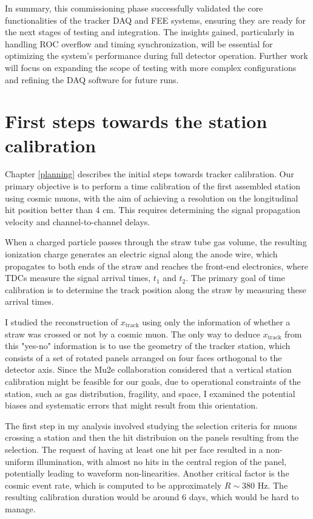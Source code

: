 In summary, this commissioning phase successfully validated 
the core functionalities 
of the tracker DAQ and FEE systems, ensuring they are ready 
for the next stages of 
testing and integration. The insights gained, particularly 
in handling ROC overflow 
and timing synchronization, will be essential for optimizing 
the system's performance 
during full detector operation. Further work will focus on 
expanding the scope of 
testing with more complex configurations and refining the 
DAQ software for future runs.


\section{First steps towards the station calibration}
Chapter \ref{planning} describes the initial steps towards 
tracker calibration. Our primary objective is to perform a time calibration of 
the first assembled station using cosmic muons, with the aim of achieving 
a resolution on the longitudinal hit position better than 4 cm. This  
requires determining the signal propagation velocity and 
channel-to-channel delays. 

When a charged particle passes through the straw tube gas volume, the 
resulting ionization charge generates an electric signal along the anode wire, 
which propagates to both ends of the straw and reaches the front-end 
electronics, where TDCs measure the signal arrival times, $t_1$ and $t_2$. The primary 
goal of time calibration is to determine the track position along the straw 
by measuring these arrival times. 

I studied the reconstruction of $x_{\text{track}}$ using only the 
information of whether a straw was crossed or not by a cosmic muon. The only 
way to deduce $x_{\text{track}}$ from this "yes-no" information is to use the geometry of the tracker station, 
which consists of a set of rotated panels arranged on four faces orthogonal 
to the detector axis. Since the Mu2e collaboration considered 
that a vertical station calibration might be feasible for our 
goals, due to operational constraints of the station, such as 
gas distribution, fragility, and space, I examined the potential 
biases and systematic errors that might result from this orientation. 

The first step in my analysis involved studying the selection criteria for 
muons crossing a station and then the hit distribuion on the panels 
resulting from the selection. 
The request of having at least one hit per face resulted in 
a non-uniform illumination, with almost no hits 
in the central region of the panel, potentially leading to 
waveform non-linearities. 
Another critical factor is the cosmic event rate, which is 
computed to be approximately 
$R \sim 380$ Hz. The resulting calibration duration would be around 6 days, 
which would be hard to manage. 

